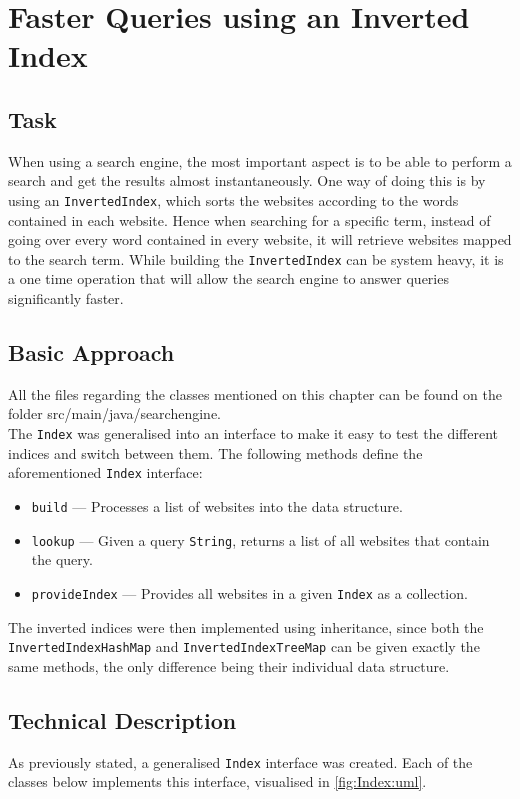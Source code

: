 \chapter{Faster Queries using an Inverted Index}

\section{Task}
When using a search engine, the most important aspect is to be able to perform a search and get the results almost instantaneously. One way of doing this is by using an {\tt InvertedIndex}, which sorts the websites according to the words contained in each website. Hence when searching for a specific term, instead of going over every word contained in every website, it will retrieve websites mapped to the search term. While building the {\tt InvertedIndex} can be system heavy, it is a one time operation that will allow the search engine to answer queries significantly faster.

\section{Basic Approach}
All the files regarding the classes mentioned on this chapter can be found on the folder src/main/java/searchengine.\\
The {\tt Index} was generalised into an interface to make it easy to test the different indices and switch between them. The following methods define the aforementioned {\tt Index} interface:
\begin{itemize}
    \item {\tt build} — Processes a list of websites into the data structure.
    \item {\tt lookup} — Given a query {\tt String}, returns a list of all websites that contain the query.
    \item {\tt provideIndex} — Provides all websites in a given {\tt Index} as a collection.
\end{itemize}
The inverted indices were then implemented using inheritance, since both the {\tt InvertedIndexHashMap} and {\tt InvertedIndexTreeMap} can be given exactly the same methods, the only difference being their individual data structure.

\section{Technical Description}
As previously stated, a generalised {\tt Index} interface was created. Each of the classes below implements this interface, visualised in \ref{fig:Index:uml}.

